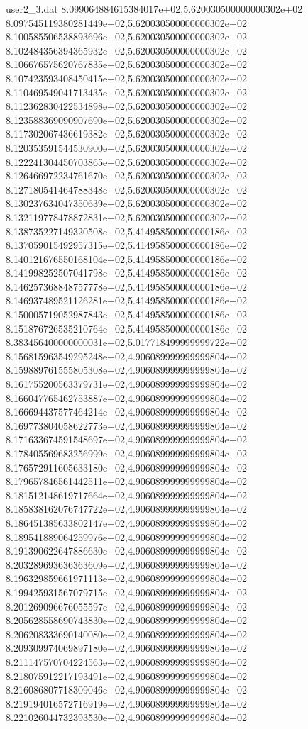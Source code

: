 \begin{filecontents}{user2_3.dat}
8.099064884615384017e+02,5.620030500000000302e+02
8.097545119380281449e+02,5.620030500000000302e+02
8.100585506538893696e+02,5.620030500000000302e+02
8.102484356394365932e+02,5.620030500000000302e+02
8.106676575620767835e+02,5.620030500000000302e+02
8.107423593408450415e+02,5.620030500000000302e+02
8.110469549041713435e+02,5.620030500000000302e+02
8.112362830422534898e+02,5.620030500000000302e+02
8.123588369090907690e+02,5.620030500000000302e+02
8.117302067436619382e+02,5.620030500000000302e+02
8.120353591544530900e+02,5.620030500000000302e+02
8.122241304450703865e+02,5.620030500000000302e+02
8.126466972234761670e+02,5.620030500000000302e+02
8.127180541464788348e+02,5.620030500000000302e+02
8.130237634047350639e+02,5.620030500000000302e+02
8.132119778478872831e+02,5.620030500000000302e+02
8.138735227149320508e+02,5.414958500000000186e+02
8.137059015492957315e+02,5.414958500000000186e+02
8.140121676550168104e+02,5.414958500000000186e+02
8.141998252507041798e+02,5.414958500000000186e+02
8.146257368848757778e+02,5.414958500000000186e+02
8.146937489521126281e+02,5.414958500000000186e+02
8.150005719052987843e+02,5.414958500000000186e+02
8.151876726535210764e+02,5.414958500000000186e+02
8.383456400000000031e+02,5.017718499999999722e+02
8.156815963549295248e+02,4.906089999999999804e+02
8.159889761555805308e+02,4.906089999999999804e+02
8.161755200563379731e+02,4.906089999999999804e+02
8.166047765462753887e+02,4.906089999999999804e+02
8.166694437577464214e+02,4.906089999999999804e+02
8.169773804058622773e+02,4.906089999999999804e+02
8.171633674591548697e+02,4.906089999999999804e+02
8.178405569683256999e+02,4.906089999999999804e+02
8.176572911605633180e+02,4.906089999999999804e+02
8.179657846561442511e+02,4.906089999999999804e+02
8.181512148619717664e+02,4.906089999999999804e+02
8.185838162076747722e+02,4.906089999999999804e+02
8.186451385633802147e+02,4.906089999999999804e+02
8.189541889064259976e+02,4.906089999999999804e+02
8.191390622647886630e+02,4.906089999999999804e+02
8.203289693636363609e+02,4.906089999999999804e+02
8.196329859661971113e+02,4.906089999999999804e+02
8.199425931567079715e+02,4.906089999999999804e+02
8.201269096676055597e+02,4.906089999999999804e+02
8.205628558690743830e+02,4.906089999999999804e+02
8.206208333690140080e+02,4.906089999999999804e+02
8.209309974069897180e+02,4.906089999999999804e+02
8.211147570704224563e+02,4.906089999999999804e+02
8.218075912217193491e+02,4.906089999999999804e+02
8.216086807718309046e+02,4.906089999999999804e+02
8.219194016572716919e+02,4.906089999999999804e+02
8.221026044732393530e+02,4.906089999999999804e+02

\end{filecontents}

